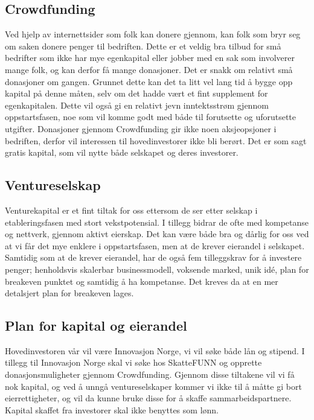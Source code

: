\subsection{Crowdfunding}
Ved hjelp av internettsider som folk kan donere gjennom, kan folk som bryr seg om saken donere penger til bedriften. Dette er et veldig bra tilbud for små bedrifter som ikke har mye egenkapital eller jobber med en sak som involverer mange folk, og kan derfor få mange donasjoner.  
Det er snakk om relativt små donasjoner om gangen. Grunnet dette kan det ta litt vel lang tid å bygge opp kapital på denne måten, selv om det hadde vært et fint supplement for egenkapitalen. Dette vil også gi en relativt jevn inntektsstrøm gjennom oppstartsfasen, noe som vil komme godt med både til forutsette og uforutsette utgifter. 
Donasjoner gjennom Crowdfunding gir ikke noen aksjeopsjoner i bedriften, derfor vil interessen til hovedinvestorer ikke bli berørt. Det er som sagt gratis kapital, som vil nytte både selskapet og deres investorer.

\subsection{Ventureselskap}
Venturekapital er et fint tiltak for oss ettersom de ser etter selskap i etableringsfasen med stort vekstpotensial. I tillegg bidrar de ofte med kompetanse og nettverk, gjennom aktivt eierskap. Det kan være både bra og dårlig for oss ved at vi får det mye enklere i oppstartsfasen, men at de krever eierandel i selskapet. Samtidig som at de krever eierandel, har de også fem tilleggskrav for å investere penger; henholdsvis skalerbar businessmodell, voksende marked, unik idé, plan for breakeven punktet og samtidig å ha kompetanse. Det kreves da at en mer detalsjert plan for breakeven lages.

\subsection{Plan for kapital og eierandel}

Hovedinvestoren vår vil være Innovasjon Norge, vi vil søke både lån og stipend. I tillegg til Innovasjon Norge skal vi søke hos SkatteFUNN og opprette donasjonsmuligheter gjennom Crowdfunding. Gjennom disse tiltakene vil vi få nok kapital, og ved å unngå ventureselskaper kommer vi ikke til å måtte gi bort eierrettigheter, og vil da kunne bruke disse for å skaffe sammarbeidspartnere. Kapital skaffet fra investorer skal ikke benyttes som lønn. 

